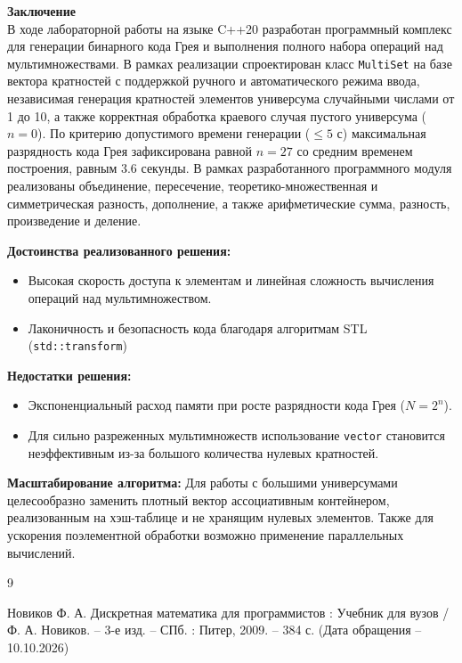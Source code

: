 \documentclass[14pt, a4paper]{extarticle}
\begin{document}
	\newpage
	\thispagestyle{empty}
	{\LARGE\bf Заключение}\\
	
	В ходе лабораторной работы на языке C++20 разработан программный комплекс для генерации бинарного кода Грея и выполнения полного набора операций над мультимножествами. В рамках реализации спроектирован класс \texttt{MultiSet} на базе вектора кратностей с поддержкой ручного и автоматического режима ввода, независимая генерация кратностей элементов универсума случайными числами от 1 до 10, а также корректная обработка краевого случая пустого универсума ($n = 0$). По критерию допустимого времени генерации ($\le 5$ с) максимальная разрядность кода Грея зафиксирована равной $n = 27$ со средним временем построения, равным 3.6 секунды. В рамках разработанного программного модуля реализованы объединение, пересечение, теоретико-множественная и симметрическая разность, дополнение, а также арифметические сумма, разность, произведение и деление.
	
	{\bf Достоинства реализованного решения:}
	\begin{itemize}
		\item Высокая скорость доступа к элементам и линейная сложность вычисления операций над мультимножеством.
		\item Лаконичность и безопасность кода благодаря алгоритмам STL\\ (\texttt{std::transform})
	\end{itemize}
	
	{\bf Недостатки решения:}
	\begin{itemize}
		\item Экспоненциальный расход памяти при росте разрядности кода Грея ($N = 2^n$).
		\item Для сильно разреженных мультимножеств использование \texttt{vector} становится неэффективным из-за большого количества нулевых кратностей.
	\end{itemize}
	
	{\bf Масштабирование алгоритма:}
	Для работы с большими универсумами целесообразно заменить плотный вектор ассоциативным контейнером, реализованным на хэш-таблице и не хранящим нулевых элементов. Также для ускорения поэлементной обработки возможно применение параллельных вычислений.
	
	\newpage
	
	\begin{thebibliography}{9}
		
		Новиков Ф. А. Дискретная математика для программистов : Учебник для вузов / Ф. А. Новиков. -- 3-е изд. -- СПб. : Питер, 2009. -- 384 с. (Дата обращения -- 10.10.2026)
	
	\end{thebibliography}
	
\end{document}
